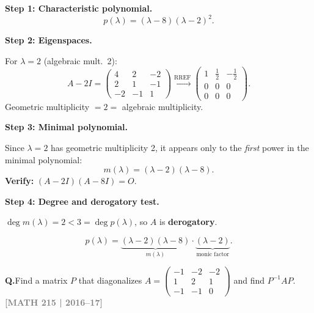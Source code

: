\documentclass[12pt,a3paper]{article}
\newcommand{\yr}[1]{\hfill\textcolor{gray}{\small\textbf{[#1]}}}
\newcounter{qnum}
\newcommand{\Q}[1]{%
  \needspace{4\baselineskip}
  \refstepcounter{qnum}
  \vspace{6pt}
  \noindent\textbf{Q\theqnum.}\enspace #1\par
}
\begin{document}
\begin{tcolorbox}[enhanced,breakable,
  colback=cE!4,colframe=cE,boxrule=0.8pt,arc=5pt,
  title={\textbf{Answer --- Minimal Polynomial \& Derogatory Test for
    $A=\begin{pmatrix}6&2&-2\\2&3&-1\\-2&-1&3\end{pmatrix}$}},
  fonttitle=\bfseries\color{white},colbacktitle=cE]

\textbf{Step 1: Characteristic polynomial.}
\[
  p(\lambda)=(\lambda-8)(\lambda-2)^2.
\]

\textbf{Step 2: Eigenspaces.}

For $\lambda=2$ (algebraic mult.\ 2):
\[
  A-2I=\begin{pmatrix}4&2&-2\\2&1&-1\\-2&-1&1\end{pmatrix}
  \xrightarrow{\text{RREF}}
  \begin{pmatrix}1&\frac{1}{2}&-\frac{1}{2}\\0&0&0\\0&0&0\end{pmatrix}.
\]
Geometric multiplicity $=2=$ algebraic multiplicity.

\textbf{Step 3: Minimal polynomial.}

Since $\lambda=2$ has geometric multiplicity 2, it appears only to the \emph{first} power
in the minimal polynomial:
\[
  m(\lambda)=(\lambda-2)(\lambda-8).
\]
\textbf{Verify:} $(A-2I)(A-8I)=O$.\;\checkmark

\textbf{Step 4: Degree and derogatory test.}

$\deg m(\lambda)=2 < 3=\deg p(\lambda)$, so $A$ is \textbf{derogatory}.

\[
  p(\lambda) = \underbrace{(\lambda-2)(\lambda-8)}_{m(\lambda)}\cdot\underbrace{(\lambda-2)}_{\text{monic factor}}.
\]

\end{tcolorbox}

\Q{Find a matrix $P$ that diagonalizes $A = \begin{pmatrix} -1 & -2 & -2 \\ 1 & 2 & 1 \\ -1 & -1 & 0 \end{pmatrix}$ and find $P^{-1}AP$.
\yr{MATH 215 | 2016--17}}
\end{document}
